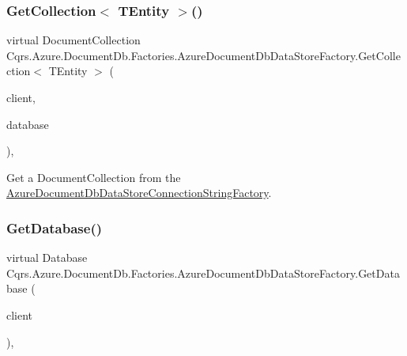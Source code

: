 \subsubsection{\texorpdfstring{Get\+Collection$<$ T\+Entity $>$()}{GetCollection< TEntity >()}}
{\footnotesize\ttfamily virtual Document\+Collection Cqrs.\+Azure.\+Document\+Db.\+Factories.\+Azure\+Document\+Db\+Data\+Store\+Factory.\+Get\+Collection$<$ T\+Entity $>$ (\begin{DoxyParamCaption}\item[{Document\+Client}]{client,  }\item[{Database}]{database }\end{DoxyParamCaption})\hspace{0.3cm}{\ttfamily [protected]}, {\ttfamily [virtual]}}



Get a Document\+Collection from the \hyperlink{classCqrs_1_1Azure_1_1DocumentDb_1_1Factories_1_1AzureDocumentDbDataStoreConnectionStringFactory}{Azure\+Document\+Db\+Data\+Store\+Connection\+String\+Factory}. 

\mbox{\label{classCqrs_1_1Azure_1_1DocumentDb_1_1Factories_1_1AzureDocumentDbDataStoreFactory_a0d010038f250f91446b9d94277c02c44_a0d010038f250f91446b9d94277c02c44}} 
\subsubsection{\texorpdfstring{Get\+Database()}{GetDatabase()}}
{\footnotesize\ttfamily virtual Database Cqrs.\+Azure.\+Document\+Db.\+Factories.\+Azure\+Document\+Db\+Data\+Store\+Factory.\+Get\+Database (\begin{DoxyParamCaption}\item[{Document\+Client}]{client }\end{DoxyParamCaption})\hspace{0.3cm}{\ttfamily [protected]}, {\ttfamily [virtual]}}



